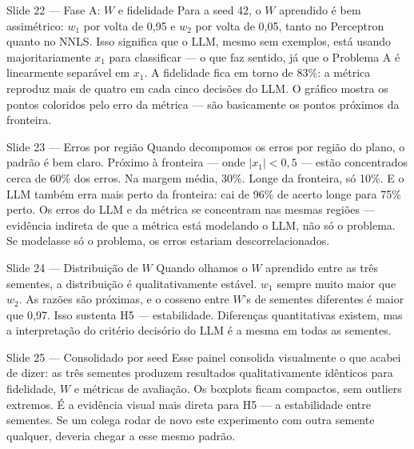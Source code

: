 \documentclass[aspectratio=169,10pt]{beamer}
\begin{document}
\begin{frame}{Slide 22 --- Fase A: $W$ e fidelidade}
\footnotesize
Para a seed 42, o $W$ aprendido \'e bem assim\'etrico: $w_1$ por volta de 0{,}95 e $w_2$ por volta de 0{,}05, tanto no Perceptron quanto no NNLS. Isso significa que o LLM, mesmo sem exemplos, est\'a usando majoritariamente $x_1$ para classificar --- o que faz sentido, j\'a que o Problema A \'e linearmente separ\'avel em $x_1$. A fidelidade fica em torno de 83\%: a m\'etrica reproduz mais de quatro em cada cinco decis\~oes do LLM. O gr\'afico mostra os pontos coloridos pelo erro da m\'etrica --- s\~ao basicamente os pontos pr\'oximos da fronteira.
\end{frame}

\begin{frame}{Slide 23 --- Erros por regi\~ao}
\footnotesize
Quando decompomos os erros por regi\~ao do plano, o padr\~ao \'e bem claro. Pr\'oximo \`a fronteira --- onde $|x_1| < 0{,}5$ --- est\~ao concentrados cerca de 60\% dos erros. Na margem m\'edia, 30\%. Longe da fronteira, s\'o 10\%. E o LLM tamb\'em erra mais perto da fronteira: cai de 96\% de acerto longe para 75\% perto. Os erros do LLM e da m\'etrica se concentram nas mesmas regi\~oes --- evid\^encia indireta de que a m\'etrica est\'a modelando o LLM, n\~ao s\'o o problema. Se modelasse s\'o o problema, os erros estariam descorrelacionados.
\end{frame}

\begin{frame}{Slide 24 --- Distribui\c{c}\~ao de $W$}
\footnotesize
Quando olhamos o $W$ aprendido entre as tr\^es sementes, a distribui\c{c}\~ao \'e qualitativamente est\'avel. $w_1$ sempre muito maior que $w_2$. As raz\~oes s\~ao pr\'oximas, e o cosseno entre $W$'s de sementes diferentes \'e maior que 0{,}97. Isso sustenta H5 --- estabilidade. Diferen\c{c}as quantitativas existem, mas a interpreta\c{c}\~ao do crit\'erio decis\'orio do LLM \'e a mesma em todas as sementes.
\end{frame}

\begin{frame}{Slide 25 --- Consolidado por seed}
\footnotesize
Esse painel consolida visualmente o que acabei de dizer: as tr\^es sementes produzem resultados qualitativamente id\^enticos para fidelidade, $W$ e m\'etricas de avalia\c{c}\~ao. Os boxplots ficam compactos, sem outliers extremos. \'E a evid\^encia visual mais direta para H5 --- a estabilidade entre sementes. Se um colega rodar de novo este experimento com outra semente qualquer, deveria chegar a esse mesmo padr\~ao.
\end{frame}
\end{document}
